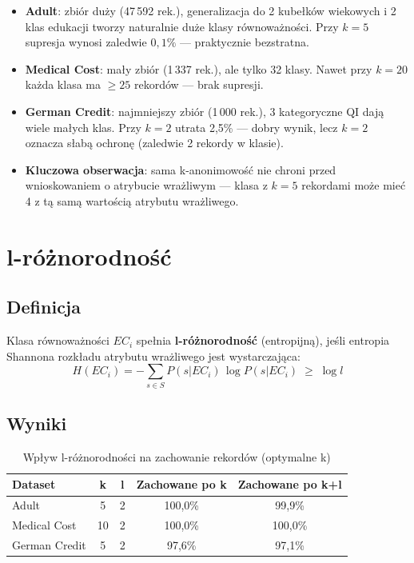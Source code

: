 \documentclass[12pt,a4paper]{article}
\begin{document}
\begin{itemize}
    \item \textbf{Adult}: zbiór duży (47\,592 rek.),
          generalizacja do 2 kubełków wiekowych i 2 klas edukacji
          tworzy naturalnie duże klasy równoważności.
          Przy $k=5$ supresja wynosi zaledwie $0{,}1\%$ --- praktycznie bezstratna.

    \item \textbf{Medical Cost}: mały zbiór (1\,337 rek.), ale tylko 32 klasy.
          Nawet przy $k=20$ każda klasa ma $\geq 25$ rekordów --- brak supresji.

    \item \textbf{German Credit}: najmniejszy zbiór (1\,000 rek.),
          3 kategoryczne QI dają wiele małych klas.
          Przy $k=2$ utrata 2{,}5\% --- dobry wynik, lecz $k=2$
          oznacza słabą ochronę (zaledwie 2 rekordy w klasie).

    \item \textbf{Kluczowa obserwacja}: sama k-anonimowość nie chroni
          przed wnioskowaniem o atrybucie wrażliwym --- klasa z $k=5$
          rekordami może mieć 4 z tą samą wartością atrybutu wrażliwego.
\end{itemize}

\section{l-różnorodność}

\subsection{Definicja}

Klasa równoważności $EC_i$ spełnia \textbf{l-różnorodność} (entropijną),
jeśli entropia Shannona rozkładu atrybutu wrażliwego jest wystarczająca:
\[
    H(EC_i) = -\sum_{s \in S} P(s|EC_i)\,\log P(s|EC_i) \;\geq\; \log l
\]

\subsection{Wyniki}

\begin{table}[H]
\centering
\caption{Wpływ l-różnorodności na zachowanie rekordów (optymalne k)}
\begin{tabular}{lcccc}
\toprule
\textbf{Dataset} & \textbf{k} & \textbf{l} & \textbf{Zachowane po k} & \textbf{Zachowane po k+l} \\
\midrule
Adult         & 5  & 2 & 100{,}0\% & 99{,}9\% \\
Medical Cost  & 10 & 2 & 100{,}0\% & 100{,}0\% \\
German Credit & 5  & 2 & 97{,}6\%  & 97{,}1\% \\
\bottomrule
\end{tabular}
\end{table}
\end{document}
